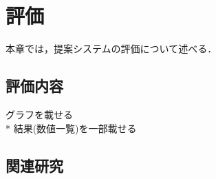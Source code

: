 \chapter{評価}
\label{evaluation}
本章では，提案システムの評価について述べる．

\section{評価内容}

グラフを載せる\\*
結果(数値一覧)を一部載せる

\section{関連研究}




